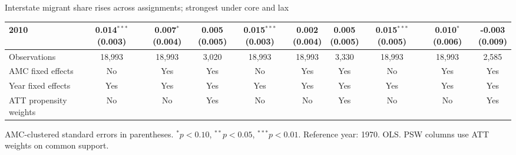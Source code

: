 \documentclass[aspectratio=169]{beamer}
\begin{document}
\begin{frame}{Interstate migrant share rises across assignments; strongest under core and lax}
{\begin{tabular}{@{}l*{9}{c}@{}}
2010 & \shortstack{0.014$^{***}$\\(0.003)} & \shortstack{0.007$^{*}$\\(0.004)} & \shortstack{0.005\\(0.005)} & \shortstack{0.015$^{***}$\\(0.003)} & \shortstack{0.002\\(0.004)} & \shortstack{0.005\\(0.005)} & \shortstack{0.015$^{***}$\\(0.005)} & \shortstack{0.010$^{*}$\\(0.006)} & \shortstack{-0.003\\(0.009)} \\
\midrule
Observations & 18,993 & 18,993 & 3,020 & 18,993 & 18,993 & 3,330 & 18,993 & 18,993 & 2,585 \\
AMC fixed effects & No & Yes & Yes & No & Yes & Yes & No & Yes & Yes \\
Year fixed effects & Yes & Yes & Yes & Yes & Yes & Yes & Yes & Yes & Yes \\
ATT propensity weights & No & No & Yes & No & No & Yes & No & No & Yes \\
\bottomrule
\end{tabular}%
}
\vspace{0.1em}
{\tiny\color{ZMidGray} AMC-clustered standard errors in parentheses. $^{*}p<0.10$, $^{**}p<0.05$, $^{***}p<0.01$. Reference year: 1970. OLS. PSW columns use ATT weights on common support.}
\end{frame}
\end{document}
